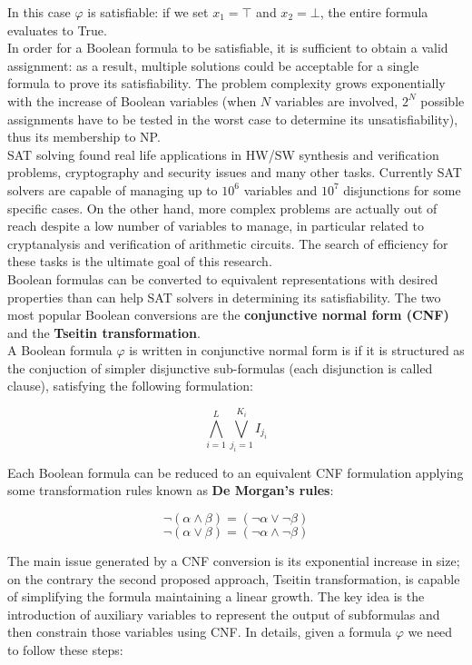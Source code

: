 In this case $\varphi$ is satisfiable: if we set $x_1 = \top$ and $x_2 = \bot$, the entire formula evaluates to True. \\
In order for a Boolean formula to be satisfiable, it is sufficient to obtain a valid assignment: as a result, multiple solutions could be acceptable for a single formula to prove its satisfiability. The problem complexity grows exponentially with the increase of Boolean variables (when $N$ variables are involved, $2^N$ possible assignments have to be tested in the worst case to determine its unsatisfiability), thus its membership to NP. \\
SAT solving found real life applications in HW/SW synthesis and verification problems, cryptography and security issues and many other tasks. Currently SAT solvers are capable of managing up to $10^6$ variables and $10^7$ disjunctions for some specific cases. On the other hand, more complex problems are actually out of reach despite a low number of variables to manage, in particular related to cryptanalysis and verification of arithmetic circuits. The search of efficiency for these tasks is the ultimate goal of this research. \\
Boolean formulas can be converted to equivalent representations with desired properties than can help SAT solvers in determining its satisfiability. The two most popular Boolean conversions are the \textbf{conjunctive normal form (CNF)} and the \textbf{Tseitin transformation}. \\
A Boolean formula $\varphi$ is written in conjunctive normal form is if it is structured as the conjuction of simpler disjunctive sub-formulas (each disjunction is called clause), satisfying the following formulation:

\begin{equation}
    \bigwedge_{i=1}^L \bigvee_{j_i=1}^{K_i} I_{j_i}
\end{equation}

Each Boolean formula can be reduced to an equivalent CNF formulation applying some transformation rules known as \textbf{De Morgan's rules}:

\begin{equation}
    \neg (\alpha \wedge \beta) = (\neg \alpha \vee \neg \beta)
\end{equation}
\begin{equation}
    \neg (\alpha \vee \beta) = (\neg \alpha \wedge \neg \beta)
\end{equation}

The main issue generated by a CNF conversion is its exponential increase in size; on the contrary the second proposed approach, Tseitin transformation, is capable of simplifying the formula maintaining a linear growth. The key idea is the introduction of auxiliary variables to represent the output of subformulas
and then constrain those variables using CNF. In details, given a formula $\varphi$ we need to follow these steps:

